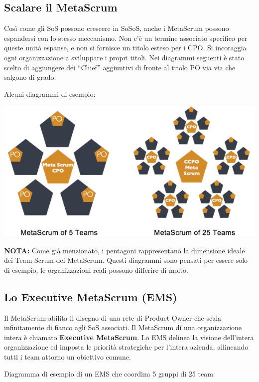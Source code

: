 \documentclass[12pt,a4paper,parskip=full]{scrartcl}
\begin{document}
\subsection{Scalare il MetaScrum}
Così come gli SoS possono crescere in SoSoS, anche i MetaScrum possono espandersi con lo stesso meccanismo. Non c'è un termine associato specifico per queste unità espanse, e non si fornisce un titolo esteso per i CPO. Si incoraggia ogni organizzazione a sviluppare i propri titoli. Nei diagrammi seguenti è stato scelto di aggiungere dei ``Chief'' aggiuntivi di fronte al titolo PO via via che salgono di grado.

Alcuni diagrammi di esempio:

\includegraphics[width=1.0\linewidth]{MetaScrum-R2.png}

\textbf{NOTA:} Come già menzionato, i pentagoni rappresentano la dimensione ideale dei Team Scrum dei MetaScrum. Questi diagrammi sono pensati per essere solo di esempio, le organizzazioni reali possono differire di molto.

\subsection{Lo Executive MetaScrum (EMS)}
Il MetaScrum abilita il disegno di una rete di Product Owner che scala infinitamente di fianco agli SoS associati. Il MetaScrum di una organizzazione intera è chiamato \textbf{Executive MetaScrum}. Lo EMS delinea la visione dell'intera organizzazione ed imposta le priorità strategiche per l'intera azienda, allineando tutti i team attorno un obiettivo comune.

Diagramma di esempio di un EMS che coordina 5 gruppi di 25 team:
\end{document}
